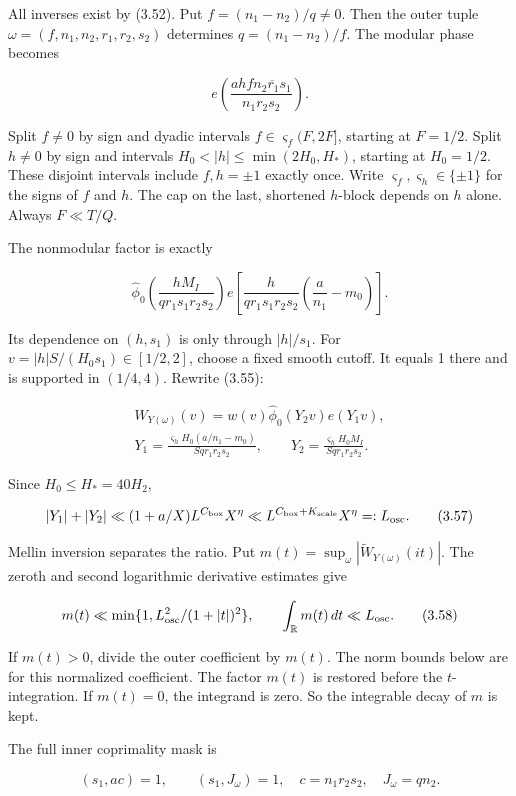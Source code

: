 All inverses exist by (3.52). Put $f=(n_1-n_2)/q\ne0$.
Then the outer tuple $\omega=(f,n_1,n_2,r_1,r_2,s_2)$ determines $q=(n_1-n_2)/f$.
The modular phase becomes

\[
e\left(\frac{ahf\overline{n_2r_1s_1}}{n_1r_2s_2}\right).
\tag{3.54}
\]

Split $f\ne0$ by sign and dyadic intervals
$f\in\varsigma_f(F,2F]$, starting at $F=1/2$. Split $h\ne0$ by
sign and intervals $H_0<|h|\le\min(2H_0,H_*)$, starting at
$H_0=1/2$. These disjoint intervals include $f,h=\pm1$ exactly
once. Write $\varsigma_f,\varsigma_h\in\{\pm1\}$ for the signs of $f$ and $h$.
The cap on the last, shortened $h$-block depends on $h$ alone.
Always $F\ll T/Q$.

The nonmodular factor is exactly

\[
\widehat\phi_0\left(\frac{hM_I}{qr_1s_1r_2s_2}\right)
 e\left[\frac{h}{qr_1s_1r_2s_2}
                   \left(\frac a{n_1}-m_0\right)\right].
\tag{3.55}
\]

Its dependence on $(h,s_1)$ is only through $|h|/s_1$. For
$v=|h|S/(H_0s_1)\in[1/2,2]$, choose a fixed smooth cutoff.
It equals 1 there and is supported in $(1/4,4)$. Rewrite (3.55):

\[
\begin{gathered}
W_{Y(\omega)}(v)=w(v)\widehat\phi_0(Y_2v)e(Y_1v),\\
Y_1=\frac{\varsigma_hH_0(a/n_1-m_0)}{Sqr_1r_2s_2},\qquad
Y_2=\frac{\varsigma_hH_0M_I}{Sqr_1r_2s_2}.
\end{gathered}
\tag{3.56}
\]

Since $H_0\le H_*=40H_2$,

\[
|Y_1|+|Y_2|\ll (1+a/X)L^{C_{\rm box}}X^\eta
 \ll L^{C_{\rm box}+K_{\rm scale}}X^\eta=:L_{\rm osc}.
\tag{3.57}
\]

Mellin inversion separates the ratio. Put
$m(t)=\sup_\omega|\widetilde W_{Y(\omega)}(it)|$.
The zeroth and second logarithmic derivative estimates give

\[
m(t)\ll\min\{1,L_{\rm osc}^2/(1+|t|)^2\},\qquad
\int_\mathbb Rm(t)\,dt\ll L_{\rm osc}.
\tag{3.58}
\]

If $m(t)>0$, divide the outer coefficient by $m(t)$.
The norm bounds below are for this normalized coefficient.
The factor $m(t)$ is restored before the $t$-integration.
If $m(t)=0$, the integrand is zero.
So the integrable decay of $m$ is kept.

The full inner coprimality mask is

\[
(s_1,ac)=1,\qquad(s_1,J_\omega)=1,
\quad c=n_1r_2s_2,\quad J_\omega=qn_2.
\tag{3.59}
\]

